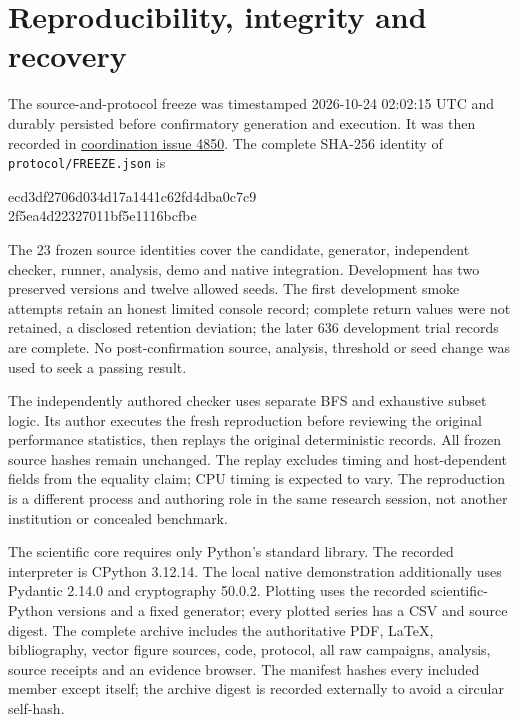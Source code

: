 \documentclass[11pt,letterpaper]{article}
\begin{document}
\section{Reproducibility, integrity and recovery}
\label{sec:reproduction}
The source-and-protocol freeze was timestamped 2026-10-24 02:02:15 UTC and durably persisted before confirmatory generation and execution. It was then recorded in \href{https://github.com/MontrealAI/AGI-Alpha-Agent-v0/issues/4850\#issuecomment-6378518568}{coordination issue 4850}. The complete SHA-256 identity of \texttt{protocol/FREEZE.json} is
\begin{center}\small\ttfamily
 ecd3df2706d034d17a1441c62fd4dba0c7c9\\
 2f5ea4d22327011bf5e1116bcfbe
\end{center}
The 23 frozen source identities cover the candidate, generator, independent checker, runner, analysis, demo and native integration. Development has two preserved versions and twelve allowed seeds. The first development smoke attempts retain an honest limited console record; complete return values were not retained, a disclosed retention deviation; the later 636 development trial records are complete. No post-confirmation source, analysis, threshold or seed change was used to seek a passing result.

The independently authored checker uses separate BFS and exhaustive subset logic. Its author executes the fresh reproduction before reviewing the original performance statistics, then replays the original deterministic records. All frozen source hashes remain unchanged. The replay excludes timing and host-dependent fields from the equality claim; CPU timing is expected to vary. The reproduction is a different process and authoring role in the same research session, not another institution or concealed benchmark.

The scientific core requires only Python's standard library. The recorded interpreter is CPython 3.12.14. The local native demonstration additionally uses Pydantic 2.14.0 and cryptography 50.0.2. Plotting uses the recorded scientific-Python versions and a fixed generator; every plotted series has a CSV and source digest. The complete archive includes the authoritative PDF, LaTeX, bibliography, vector figure sources, code, protocol, all raw campaigns, analysis, source receipts and an evidence browser. The manifest hashes every included member except itself; the archive digest is recorded externally to avoid a circular self-hash.
\end{document}
